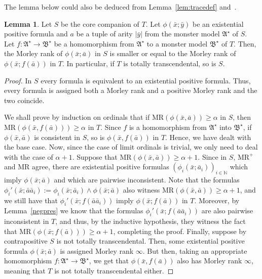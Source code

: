 \documentclass{amsart}
\theoremstyle{definition}
\newtheorem{lemma}[theorem]{Lemma}
\theoremstyle{remark}
\numberwithin{equation}{section}
\newcommand{\RM}{\mathrm{MR}}
\newcommand{\fa}{\mathfrak{A}}
\newcommand{\fb}{\mathfrak{B}}
\begin{document}
The lemma below could also be deduced from Lemma~\ref{lem:tracedef} and~\cite[Proposition 7.36]{Walsberglong}.

\begin{lemma}\label{lem:MR} Let $S$ be the core companion  of $T$. Let $\phi(\bar{x};\bar{y})$ be an existential positive formula and $a$ be a tuple of arity $|\bar{y}|$ from the monster model $\fa^\star$ of $S$. Let $f \colon \fa^\star\to\fb^\star$ be a homomorphism from $\fa^\star$ to a monster model $\fb^\star$ of $T$. Then, the Morley rank of $\phi(\bar{x};\bar{a})$ in $S$ is smaller or equal to the Morley rank of $\phi(\bar{x};f(\bar{a}))$ in $T$. In particular, if $T$ is totally transcendental, so is $S$.
\end{lemma}
\begin{proof} In $S$ every formula is equivalent to an existential positive formula. Thus, every formula is assigned both a Morley rank and a positive Morley rank and the two coincide.

We shall prove by induction on ordinals that if $\RM(\phi(\bar{x},\bar{a}))\geq\alpha$ in $S$, then $\RM(\phi(\bar{x},f(\bar{a})))\geq\alpha$ in $T$. Since $f$ is a homomorphism from $\fa^\star$ into $\fb^\star$, if $\phi(\bar{x},\bar{a})$ is consistent in $S$, so is $\phi(\bar{x},f(\bar{a}))$ in $T$. Hence, we have dealt with the base case. Now, since the case of limit ordinals is trivial, we only need to deal with the case of $\alpha+1$. Suppose that $\RM(\phi(\bar{x},\bar{a}))\geq\alpha+1$. Since in $S$, $\RM^+$ and $\RM$ agree, there are existential positive formulas $(\phi_i(\bar{x};\bar{a}_i))_{i\in\mathbb{N}}$ which imply $\phi(\bar{x};\bar{a})$ and which are pairwise inconsistent.  Note that the formulas $\phi_i'(\bar{x}; {\bar{a}\bar{a}_i}):=\phi_i(\bar{x};\bar{a}_i)\wedge \phi(\bar{x};\bar{a})$ also witness $\RM(\phi(\bar{x},\bar{a}))\geq\alpha+1$, and we still have that $\phi_i'(\bar{x}; f({\bar{a}\bar{a}_i}))$ imply $\phi(\bar{x}; f(\bar{a}))$ in $T$. Moreover, by Lemma~\ref{negpres} we know that the formulas $\phi_i'(\bar{x}; f({\bar{a}\bar{a}_i}))$  are also pairwise inconsistent in $T$, and thus,
by the inductive hypothesis, they witness the fact that $\RM(\phi(\bar{x};f(\bar{a})))\geq \alpha+1$, completing the proof. Finally, suppose by contrapositive $S$ is not totally transcendental.
Then, some existential positive formula $\phi(\bar{x};\bar{a})$ is assigned Morley rank $\infty$. But then, taking an appropriate homomorphism $f \colon \fa^\star\to\fb^\star$, we get that $\phi(\bar{x},f(\bar{a}))$ also has Morley rank $\infty$, meaning that $T$ is not totally transcendental either. 
\end{proof}
\end{document}
